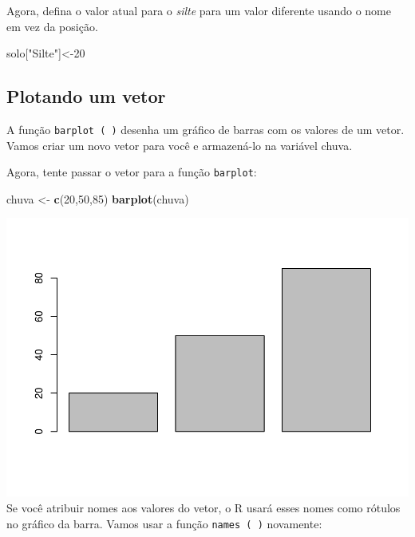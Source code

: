 \documentclass[]{book}
\newenvironment{Shaded}{\begin{snugshade}}{\end{snugshade}}
\newcommand{\DecValTok}[1]{\textcolor[rgb]{0.00,0.00,0.81}{#1}}
\newcommand{\KeywordTok}[1]{\textcolor[rgb]{0.13,0.29,0.53}{\textbf{#1}}}
\newcommand{\NormalTok}[1]{#1}
\newcommand{\StringTok}[1]{\textcolor[rgb]{0.31,0.60,0.02}{#1}}
\begin{document}
Agora, defina o valor atual para o \emph{silte} para um valor diferente usando o nome em vez da posição.

\begin{Shaded}
\begin{Highlighting}[]
\NormalTok{solo[}\StringTok{"Silte"}\NormalTok{]<-}\DecValTok{20}
\end{Highlighting}
\end{Shaded}

\hypertarget{plotando-um-vetor}{%
\subsection{Plotando um vetor}\label{plotando-um-vetor}}

A função \texttt{barplot\ (\ )} desenha um gráfico de barras com os valores de um vetor. Vamos criar um novo vetor para você e armazená-lo na variável chuva.

Agora, tente passar o vetor para a função \texttt{barplot}:

\begin{Shaded}
\begin{Highlighting}[]
\NormalTok{chuva <-}\StringTok{ }\KeywordTok{c}\NormalTok{(}\DecValTok{20}\NormalTok{,}\DecValTok{50}\NormalTok{,}\DecValTok{85}\NormalTok{)}
\KeywordTok{barplot}\NormalTok{(chuva)}
\end{Highlighting}
\end{Shaded}

\includegraphics{TudodoR_files/figure-latex/unnamed-chunk-32-1.pdf}
Se você atribuir nomes aos valores do vetor, o R usará esses nomes como rótulos no gráfico da barra. Vamos usar a função \texttt{names\ (\ )} novamente:
\end{document}
